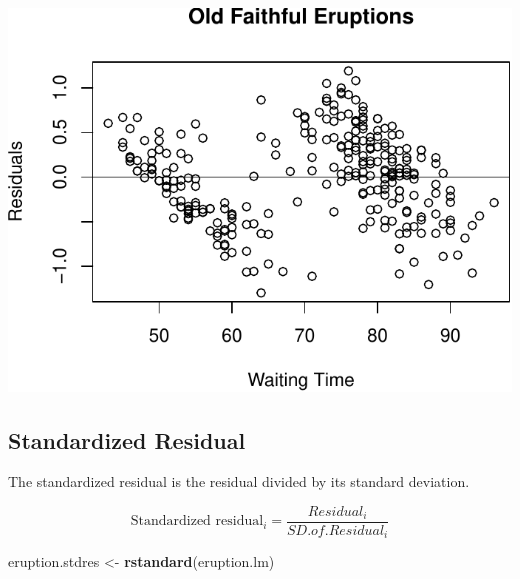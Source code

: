 \documentclass[]{article}
\newenvironment{Shaded}{\begin{snugshade}}{\end{snugshade}}
\newcommand{\KeywordTok}[1]{\textcolor[rgb]{0.13,0.29,0.53}{\textbf{{#1}}}}
\newcommand{\DataTypeTok}[1]{\textcolor[rgb]{0.13,0.29,0.53}{{#1}}}
\newcommand{\DecValTok}[1]{\textcolor[rgb]{0.00,0.00,0.81}{{#1}}}
\newcommand{\StringTok}[1]{\textcolor[rgb]{0.31,0.60,0.02}{{#1}}}
\newcommand{\NormalTok}[1]{{#1}}
\numberwithin{equation}{section}
\begin{document}
\begin{Shaded}
\end{Shaded}

\includegraphics{index_files/figure-latex/unnamed-chunk-200-1.pdf}

\subsection{Standardized Residual}\label{standardized-residual}

The standardized residual is the residual divided by its standard
deviation.

\[
\mbox{Standardized residual}_i =  \frac{Residual_i}{SD.of.Residual_i}
\]

\begin{Shaded}
\begin{Highlighting}[]
\NormalTok{eruption.stdres <-}\StringTok{ }\KeywordTok{rstandard}\NormalTok{(eruption.lm) }
\end{Highlighting}
\end{Shaded}

\begin{Shaded}
\end{Shaded}
\end{document}
